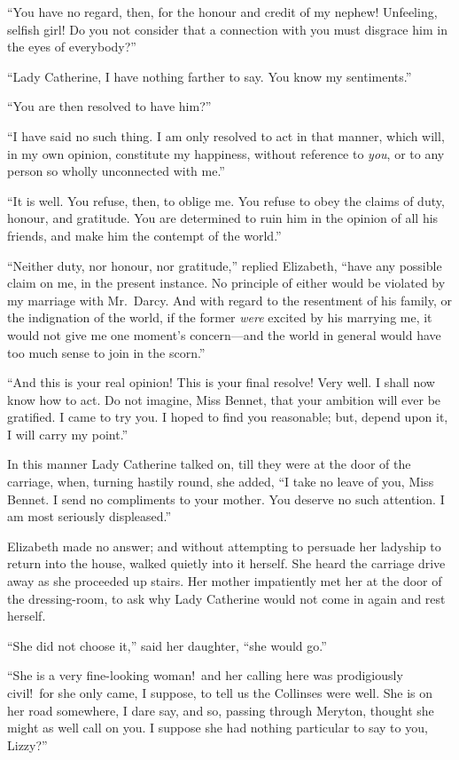 \documentclass[12pt,english]{book}
\begin{document}
{}``You have no regard, then, for the honour and credit of my nephew!
Unfeeling, selfish girl! Do you not consider that a connection with
you must disgrace him in the eyes of everybody?''\ 

{}``Lady Catherine, I have nothing farther to say. You know my sentiments.''

{}``You are then resolved to have him?''\ 

{}``I have said no such thing. I am only resolved to act in that
manner, which will, in my own opinion, constitute my happiness, without
reference to \textit{you}, or to any person so wholly unconnected
with me.''

{}``It is well. You refuse, then, to oblige me. You refuse to obey
the claims of duty, honour, and gratitude. You are determined to ruin
him in the opinion of all his friends, and make him the contempt of
the world.''

{}``Neither duty, nor honour, nor gratitude,'' replied Elizabeth,
{}``have any possible claim on me, in the present instance. No principle
of either would be violated by my marriage with Mr.\ Darcy. And with
regard to the resentment of his family, or the indignation of the
world, if the former \textit{were} excited by his marrying me, it
would not give me one moment's concern\mbox{---}and the world in
general would have too much sense to join in the scorn.''

{}``And this is your real opinion! This is your final resolve! Very
well. I shall now know how to act. Do not imagine, Miss Bennet, that
your ambition will ever be gratified. I came to try you. I hoped to
find you reasonable; but, depend upon it, I will carry my point.''

In this manner Lady Catherine talked on, till they were at the door
of the carriage, when, turning hastily round, she added, {}``I take
no leave of you, Miss Bennet. I send no compliments to your mother.
You deserve no such attention. I am most seriously displeased.''

Elizabeth made no answer; and without attempting to persuade her ladyship
to return into the house, walked quietly into it herself. She heard
the carriage drive away as she proceeded up stairs. Her mother impatiently
met her at the door of the dressing-room, to ask why Lady Catherine
would not come in again and rest herself.

{}``She did not choose it,'' said her daughter, {}``she would go.''

{}``She is a very fine-looking woman!\ and her calling here was
prodigiously civil!\ for she only came, I suppose, to tell us the
Collinses were well. She is on her road somewhere, I dare say, and
so, passing through Meryton, thought she might as well call on you.
I suppose she had nothing particular to say to you, Lizzy?''\ 
\end{document}
